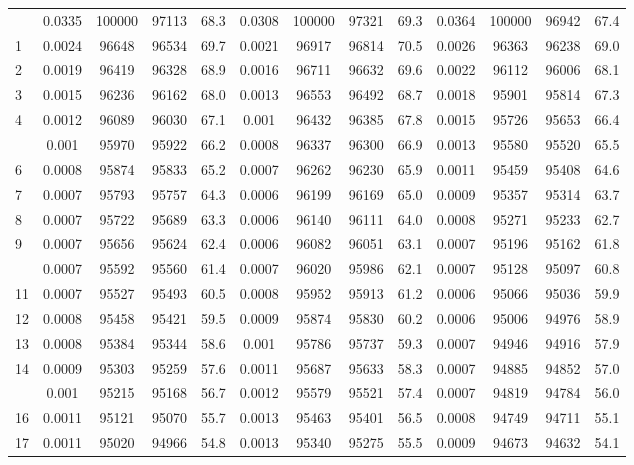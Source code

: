 \documentclass[
  14pt,
]{article}
\begin{document}
\begin{longtable}[t]{lcccccccccccc}
\endfoot
\bottomrule
\endlastfoot
0 & 0.0335 & 100000 & 97113 & 68.3 & 0.0308 & 100000 & 97321 & 69.3 & 0.0364 & 100000 & 96942 & 67.4\\
1 & 0.0024 & 96648 & 96534 & 69.7 & 0.0021 & 96917 & 96814 & 70.5 & 0.0026 & 96363 & 96238 & 69.0\\
2 & 0.0019 & 96419 & 96328 & 68.9 & 0.0016 & 96711 & 96632 & 69.6 & 0.0022 & 96112 & 96006 & 68.1\\
3 & 0.0015 & 96236 & 96162 & 68.0 & 0.0013 & 96553 & 96492 & 68.7 & 0.0018 & 95901 & 95814 & 67.3\\
4 & 0.0012 & 96089 & 96030 & 67.1 & 0.001 & 96432 & 96385 & 67.8 & 0.0015 & 95726 & 95653 & 66.4\\
\addlinespace
5 & 0.001 & 95970 & 95922 & 66.2 & 0.0008 & 96337 & 96300 & 66.9 & 0.0013 & 95580 & 95520 & 65.5\\
6 & 0.0008 & 95874 & 95833 & 65.2 & 0.0007 & 96262 & 96230 & 65.9 & 0.0011 & 95459 & 95408 & 64.6\\
7 & 0.0007 & 95793 & 95757 & 64.3 & 0.0006 & 96199 & 96169 & 65.0 & 0.0009 & 95357 & 95314 & 63.7\\
8 & 0.0007 & 95722 & 95689 & 63.3 & 0.0006 & 96140 & 96111 & 64.0 & 0.0008 & 95271 & 95233 & 62.7\\
9 & 0.0007 & 95656 & 95624 & 62.4 & 0.0006 & 96082 & 96051 & 63.1 & 0.0007 & 95196 & 95162 & 61.8\\
\addlinespace
10 & 0.0007 & 95592 & 95560 & 61.4 & 0.0007 & 96020 & 95986 & 62.1 & 0.0007 & 95128 & 95097 & 60.8\\
11 & 0.0007 & 95527 & 95493 & 60.5 & 0.0008 & 95952 & 95913 & 61.2 & 0.0006 & 95066 & 95036 & 59.9\\
12 & 0.0008 & 95458 & 95421 & 59.5 & 0.0009 & 95874 & 95830 & 60.2 & 0.0006 & 95006 & 94976 & 58.9\\
13 & 0.0008 & 95384 & 95344 & 58.6 & 0.001 & 95786 & 95737 & 59.3 & 0.0007 & 94946 & 94916 & 57.9\\
14 & 0.0009 & 95303 & 95259 & 57.6 & 0.0011 & 95687 & 95633 & 58.3 & 0.0007 & 94885 & 94852 & 57.0\\
\addlinespace
15 & 0.001 & 95215 & 95168 & 56.7 & 0.0012 & 95579 & 95521 & 57.4 & 0.0007 & 94819 & 94784 & 56.0\\
16 & 0.0011 & 95121 & 95070 & 55.7 & 0.0013 & 95463 & 95401 & 56.5 & 0.0008 & 94749 & 94711 & 55.1\\
17 & 0.0011 & 95020 & 94966 & 54.8 & 0.0013 & 95340 & 95275 & 55.5 & 0.0009 & 94673 & 94632 & 54.1\\

\end{longtable}
\end{document}
